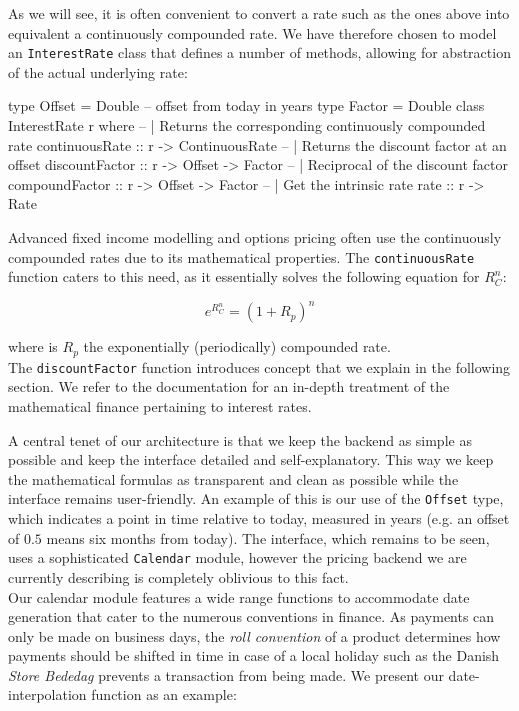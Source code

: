 As we will see, it is often convenient to convert a rate such as the ones above
into equivalent a continuously compounded rate. We have therefore chosen to model an
\texttt{InterestRate} class that defines a number of methods, allowing for
abstraction of the actual underlying rate:

\begin{hscode}
type Offset = Double -- offset from today in years
type Factor = Double
class InterestRate r where
  -- | Returns the corresponding continuously compounded rate
  continuousRate :: r -> ContinuousRate
  -- | Returns the discount factor at an offset
  discountFactor :: r -> Offset -> Factor 
  -- | Reciprocal of the discount factor
  compoundFactor :: r -> Offset -> Factor 
  -- | Get the intrinsic rate
  rate           :: r -> Rate
\end{hscode}

Advanced fixed income modelling and options 
pricing often use the continuously compounded rates due to its mathematical 
properties\cite{HULL}. The \texttt{continuousRate} function caters to this
need, as it essentially solves the following equation for $R_C^n$:

\begin{equation}
e^{R_C^n} = (1+R_p)^n
\end{equation}

where is $R_p$ the exponentially (periodically) compounded rate.\\

The \texttt{discountFactor} function introduces concept that we
explain in the following section. We refer to the \hql documentation\cite{hqldoc}
for an in-depth treatment of the mathematical finance pertaining to interest
rates.

A central tenet of our architecture is that we keep the backend
as simple as possible and keep the interface detailed and 
self-explanatory. This way we keep the mathematical formulas as transparent
and clean as possible while the interface remains user-friendly. An example
of this is our use of the \texttt{Offset} type, which indicates a point in 
time relative to today, measured in years (e.g. an offset of $0.5$
means six months from today). The interface, which remains to be seen, uses
a sophisticated \texttt{Calendar} module, however the pricing backend we
are currently describing is completely oblivious to this fact.\\

Our calendar module features a wide range functions to accommodate date
generation that cater to the numerous conventions in finance. As payments
can only be made on business days, the \emph{roll convention} of a product
determines how payments should be shifted in time in case of a local
holiday such as the Danish \emph{Store Bededag} prevents a transaction from
being made. We present our date-interpolation function as an example:

